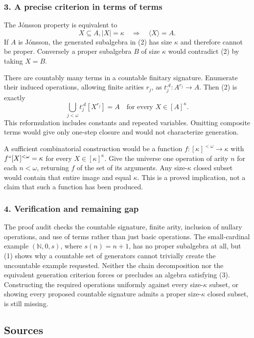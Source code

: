 \documentclass[11pt,a4paper]{article}
\begin{document}
\subsubsection{3. A precise criterion in terms of terms}
The Jónsson property is equivalent to
\[X\subseteq A, |X|=\kappa\quad\Longrightarrow\quad\langle X\rangle=A.\tag{2}\]
If $A$ is Jónsson, the generated subalgebra in (2) has size $\kappa$ and therefore cannot be proper. Conversely a proper subalgebra $B$ of size $\kappa$ would contradict (2) by taking $X=B$.

There are countably many terms in a countable finitary signature. Enumerate their induced operations, allowing finite arities $r_j$, as $t_j^\mathcal A:A^{r_j}\to A$. Then (2) is exactly
\[\bigcup_{j<\omega}t_j^\mathcal A[X^{r_j}]=A
\quad\text{for every }X\in[A]^\kappa.\tag{3}\]
This reformulation includes constants and repeated variables. Omitting composite terms would give only one-step closure and would not characterize generation.

A sufficient combinatorial construction would be a function $f:[\kappa]^{<\omega}\to\kappa$ with $f``[X]^{<\omega}=\kappa$ for every $X\in[\kappa]^\kappa$. Give the universe one operation of arity $n$ for each $n<\omega$, returning $f$ of the set of its arguments. Any size-$\kappa$ closed subset would contain that entire image and equal $\kappa$. This is a proved implication, not a claim that such a function has been produced.

\subsubsection{4. Verification and remaining gap}
The proof audit checks the countable signature, finite arity, inclusion of nullary operations, and use of terms rather than just basic operations. The small-cardinal example $(\mathbb N,0,s)$, where $s(n)=n+1$, has no proper subalgebra at all, but (1) shows why a countable set of generators cannot trivially create the uncountable example requested. Neither the chain decomposition nor the equivalent generation criterion forces or precludes an algebra satisfying (3). Constructing the required operations uniformly against every size-$\kappa$ subset, or showing every proposed countable signature admits a proper size-$\kappa$ closed subset, is still missing.

\subsection{Sources}
\end{document}
